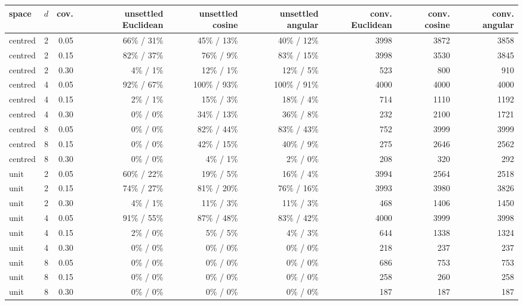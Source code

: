 \begin{tabular}{lrrrrrrrr}
\toprule
space & $d$ & cov. & unsettled Euclidean & unsettled cosine & unsettled angular & conv. Euclidean & conv. cosine & conv. angular \\
\midrule
centred & 2 & 0.05 & 66\% / 31\% & 45\% / 13\% & 40\% / 12\% & 3998 & 3872 & 3858 \\
centred & 2 & 0.15 & 82\% / 37\% & 76\% / 9\% & 83\% / 15\% & 3998 & 3530 & 3845 \\
centred & 2 & 0.30 & 4\% / 1\% & 12\% / 1\% & 12\% / 5\% & 523 & 800 & 910 \\
centred & 4 & 0.05 & 92\% / 67\% & 100\% / 93\% & 100\% / 91\% & 4000 & 4000 & 4000 \\
centred & 4 & 0.15 & 2\% / 1\% & 15\% / 3\% & 18\% / 4\% & 714 & 1110 & 1192 \\
centred & 4 & 0.30 & 0\% / 0\% & 34\% / 13\% & 36\% / 8\% & 232 & 2100 & 1721 \\
centred & 8 & 0.05 & 0\% / 0\% & 82\% / 44\% & 83\% / 43\% & 752 & 3999 & 3999 \\
centred & 8 & 0.15 & 0\% / 0\% & 42\% / 15\% & 40\% / 9\% & 275 & 2646 & 2562 \\
centred & 8 & 0.30 & 0\% / 0\% & 4\% / 1\% & 2\% / 0\% & 208 & 320 & 292 \\
unit & 2 & 0.05 & 60\% / 22\% & 19\% / 5\% & 16\% / 4\% & 3994 & 2564 & 2518 \\
unit & 2 & 0.15 & 74\% / 27\% & 81\% / 20\% & 76\% / 16\% & 3993 & 3980 & 3826 \\
unit & 2 & 0.30 & 4\% / 1\% & 11\% / 3\% & 11\% / 3\% & 468 & 1406 & 1450 \\
unit & 4 & 0.05 & 91\% / 55\% & 87\% / 48\% & 83\% / 42\% & 4000 & 3999 & 3998 \\
unit & 4 & 0.15 & 2\% / 0\% & 5\% / 5\% & 4\% / 3\% & 644 & 1338 & 1324 \\
unit & 4 & 0.30 & 0\% / 0\% & 0\% / 0\% & 0\% / 0\% & 218 & 237 & 237 \\
unit & 8 & 0.05 & 0\% / 0\% & 0\% / 0\% & 0\% / 0\% & 686 & 753 & 753 \\
unit & 8 & 0.15 & 0\% / 0\% & 0\% / 0\% & 0\% / 0\% & 258 & 260 & 258 \\
unit & 8 & 0.30 & 0\% / 0\% & 0\% / 0\% & 0\% / 0\% & 187 & 187 & 187 \\
\bottomrule
\end{tabular}
